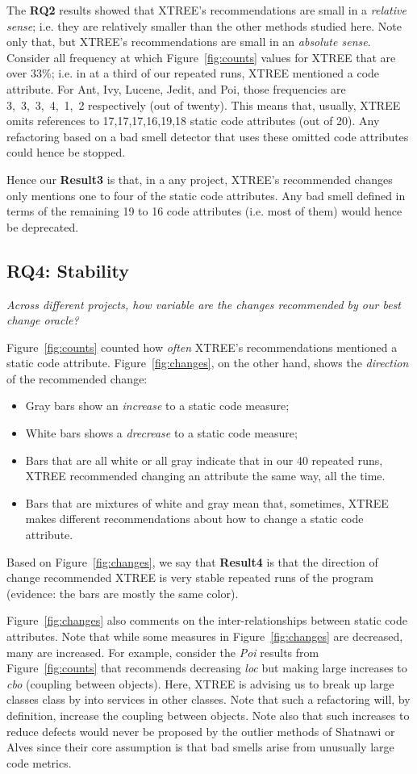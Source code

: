 \documentclass[twocolumn,5p]{elsarticle}
\newcommand{\bi}{\begin{itemize}[leftmargin=0.4cm]}
\newcommand{\ei}{\end{itemize}}
\newcommand{\fig}[1]{Figure~\ref{fig:#1}}
\theoremstyle{break}
\begin{document}
\begin{itemize}
		The {\bf RQ2} results showed that XTREE's recommendations are small in a {\em relative sense}; i.e. they are 
		relatively smaller than the other methods studied here.
		Note only that, but XTREE's recommendations are small in an {\em absolute sense}.
		Consider all frequency at which  \fig{counts} values for XTREE that are over 33\%; i.e. in at a third of our  repeated runs, XTREE mentioned
		a code attribute. For Ant, Ivy, Lucene, Jedit, and Poi, those frequencies
		are  \mbox{3, 3, 3, 4, 1, 2} respectively (out of twenty). This means that, usually, XTREE omits references to \mbox{17,17,17,16,19,18} static
		code attributes (out of 20). 
		Any refactoring based on a bad smell detector that uses  these omitted code attributes could hence  be stopped.
		
		Hence our {\bf Result3} is that, in a any  project,  XTREE's  recommended  changes  only  mentions one to four 
		of the  static code attributes.  Any bad smell defined in terms of the remaining 19 to 16 code attributes (i.e. most of them)
		would hence be deprecated.
		
		
		\subsection{RQ4: Stability}
		
		{\em Across different projects, how variable are the changes recommended by our best change oracle? }
		
		
		\fig{counts} counted how {\em often} XTREE's recommendations mentioned a static code attribute.
		\fig{changes}, on the other hand, shows the {\em direction} of the recommended change:
		\bi
		\item Gray bars show  an  {\em increase} to a static code measure;
		\item White bars shows a   {\em drecrease} to a static code measure;
		\item Bars that are all white or all gray indicate that in our 40 repeated runs, XTREE recommended changing an attribute the same way, all the time.
		\item Bars that are mixtures of white and gray mean that, sometimes, XTREE makes different recommendations about how to change a static
		code attribute.
		\ei
		Based on \fig{changes}, we say that {\bf Result4} is that the direction of change recommended  XTREE is  very stable repeated runs of the program  (evidence:
		the bars are mostly the same color).
		
		\fig{changes} also comments on the inter-relationships between static code attributes. Note that while some measures in
		\fig{changes} are decreased, many are increased.  
		For example, consider the {\em Poi} results
		from \fig{counts} that recommends decreasing {\em loc}
		but making large increases to {\em cbo} (coupling between
		objects). Here, XTREE is advising us to break up
		large classes class by into services
		in other classes. Note that such a refactoring will, by
		definition, increase the coupling between objects. 
		Note also that such increases  to reduce
		defects would never be proposed by the outlier methods
		of Shatnawi or Alves since their core assumption is that bad
		smells arise from unusually large code metrics.
		

\end{itemize}
\end{document}

